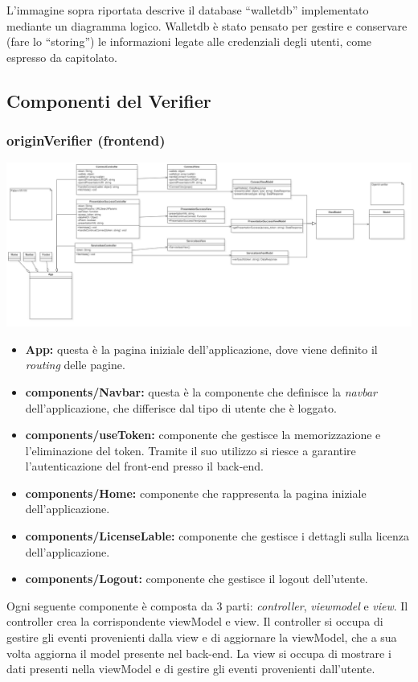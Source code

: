     L’immagine sopra riportata descrive il database “walletdb” implementato mediante un diagramma logico.
    Walletdb è stato pensato per gestire e conservare (fare lo “storing”) le informazioni legate alle credenziali degli utenti, come espresso da capitolato.\\
    

\subsection{Componenti del \textbf{Verifier}}
\subsubsection{originVerifier (frontend)}
\includegraphics[scale=0.22]{./res/img/frontendverifier.png}
\begin{itemize}
    \item \textbf{App:} questa è la pagina iniziale dell'applicazione, dove viene definito il \textit{routing} delle pagine.
    \item \textbf{components/Navbar:} questa è la componente che definisce la \textit{navbar} dell'applicazione, che differisce dal tipo di utente che è loggato.
    \item \textbf{components/useToken:} componente che gestisce la memorizzazione e l'eliminazione del token. Tramite il suo utilizzo si riesce a garantire l'autenticazione del front-end presso il back-end.
    \item \textbf{components/Home:} componente che rappresenta la pagina iniziale dell'applicazione.
    \item \textbf{components/LicenseLable:} componente che gestisce i dettagli sulla licenza dell'applicazione.
    \item \textbf{components/Logout:} componente che gestisce il logout dell'utente.  
\end{itemize}

Ogni seguente componente è composta da 3 parti: \textit{controller}, \textit{viewmodel} e \textit{view}. Il controller crea la corrispondente
viewModel e view. Il controller si occupa di gestire gli eventi provenienti dalla view e di aggiornare la viewModel, che a sua volta aggiorna 
il model presente nel back-end. La view si occupa di mostrare i dati presenti nella viewModel e di gestire gli eventi provenienti dall'utente.

